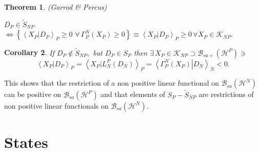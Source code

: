 \documentclass[aps,preprint]{revtex4}%
\newtheorem{theorem}{Theorem}
\newtheorem{corollary}[theorem]{Corollary}
\begin{document}
\begin{theorem}
(Garrod \& Percus)
\end{theorem}

$D_{P}\in\tilde{S}_{NP}$ $\Longleftrightarrow\left\{  \left\langle \left.
X_{P}\right\vert D_{P}\right\rangle _{P}\geq0\,\,\forall\,\Gamma_{P}%
^{N}\left(  X_{P}\right)  \geq0\right\}  \equiv\left\langle \left.
X_{P}\right\vert D_{P}\right\rangle _{P}\geq0\,\forall X_{P}\in\mathcal{K}%
_{NP}.$

\begin{corollary}
If $D_{P}\notin\tilde{S}_{NP},$ but $D_{P}\in S_{P}$ then $\exists\,X_{P}%
\in\mathcal{K}_{NP}\supset\mathcal{B}_{sa+}\left(  \mathcal{H}^{P}\right)
\ni$
\begin{equation}
\left\langle \left.  X_{P}\right\vert D_{P}\right\rangle _{P}=\left\langle
\left.  X_{P}\right\vert L_{N}^{P}\left(  D_{N}\right)  \right\rangle
_{P}=\left\langle \left.  \Gamma_{P}^{N}\left(  X_{P}\right)  \right\vert
D_{N}\right\rangle _{N}<0.
\end{equation}

\end{corollary}

This shows that the restriction of a non positive linear functional on
$\mathcal{B}_{sa}\left(  \mathcal{H}^{N}\right)  $ can be positive on
$\mathcal{B}_{sa}\left(  \mathcal{H}^{P}\right)  $ and that elements of
$S_{P}-\tilde{S}_{NP}$ are restrictions of non positive linear functionals on
$\mathcal{B}_{sa}\left(  \mathcal{H}^{N}\right)  .$

\section{States}
\end{document}
